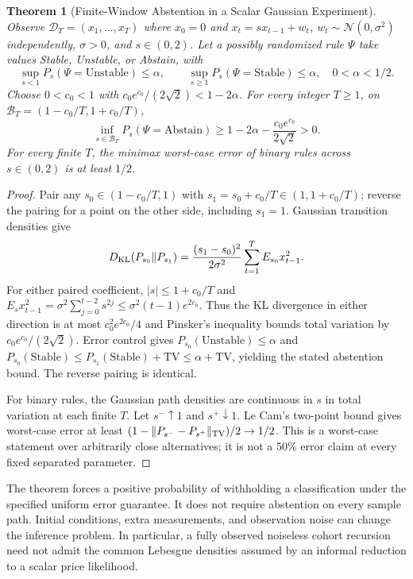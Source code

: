\documentclass[12pt]{article}
\newtheorem{theorem}{Theorem}[section]
\theoremstyle{definition}
\theoremstyle{remark}
\begin{document}
\begin{theorem}[Finite-Window Abstention in a Scalar Gaussian Experiment]
\label{thm:m3_minimax_abstention}
Observe $\mathcal D_T=(x_1,\ldots,x_T)$ where $x_0=0$ and $x_t=sx_{t-1}+w_t$, $w_t\sim\mathcal N(0,\sigma^2)$ independently, $\sigma>0$, and $s\in(0,2)$. Let a possibly randomized rule $\Psi$ take values Stable, Unstable, or Abstain, with
\[
\sup_{s<1}P_s(\Psi=\mathrm{Unstable})\le\alpha,
\qquad \sup_{s\ge1}P_s(\Psi=\mathrm{Stable})\le\alpha,
\quad 0<\alpha<1/2.
\]
Choose $0<c_0<1$ with $c_0e^{c_0}/(2\sqrt2)<1-2\alpha$. For every integer $T\ge1$, on $\mathcal B_T=(1-c_0/T,1+c_0/T)$,
\begin{equation}
\inf_{s\in\mathcal B_T}P_s(\Psi=\mathrm{Abstain})
\ge1-2\alpha-\frac{c_0e^{c_0}}{2\sqrt2}>0.
\label{eq:abstain_bound}
\end{equation}
For every finite $T$, the minimax worst-case error of binary rules across $s\in(0,2)$ is at least $1/2$.
\end{theorem}
\begin{proof}
Pair any $s_0\in(1-c_0/T,1)$ with $s_1=s_0+c_0/T\in(1,1+c_0/T)$; reverse the pairing for a point on the other side, including $s_1=1$. Gaussian transition densities give
\[
D_{\rm KL}(P_{s_0}\|P_{s_1})
=\frac{(s_1-s_0)^2}{2\sigma^2}\sum_{t=1}^T E_{s_0}x_{t-1}^2.
\]
For either paired coefficient, $|s|\le1+c_0/T$ and
$E_sx_{t-1}^2=\sigma^2\sum_{j=0}^{t-2}s^{2j}\le\sigma^2(t-1)e^{2c_0}$.
Thus the KL divergence in either direction is at most $c_0^2e^{2c_0}/4$ and Pinsker's inequality bounds total variation by $c_0e^{c_0}/(2\sqrt2)$. Error control gives $P_{s_0}(\mathrm{Unstable})\le\alpha$ and $P_{s_0}(\mathrm{Stable})\le P_{s_1}(\mathrm{Stable})+\mathrm{TV}\le\alpha+\mathrm{TV}$, yielding the stated abstention bound. The reverse pairing is identical.

For binary rules, the Gaussian path densities are continuous in $s$ in total variation at each finite $T$. Let $s^-\uparrow1$ and $s^+\downarrow1$. Le Cam's two-point bound gives worst-case error at least $(1-\|P_{s^-}-P_{s^+}\|_{\rm TV})/2\to1/2$. This is a worst-case statement over arbitrarily close alternatives; it is not a 50\% error claim at every fixed separated parameter.
\end{proof}

The theorem forces a positive probability of withholding a classification under the specified uniform error guarantee. It does not require abstention on every sample path. Initial conditions, extra measurements, and observation noise can change the inference problem. In particular, a fully observed noiseless cohort recursion need not admit the common Lebesgue densities assumed by an informal reduction to a scalar price likelihood.
\end{document}
